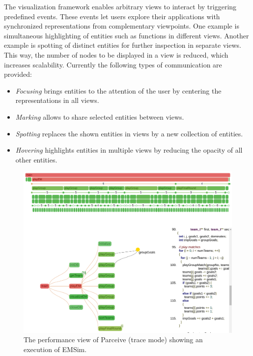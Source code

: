 The visualization framework enables arbitrary views to interact by triggering
predefined events. These events let users explore their applications with
synchronized representations from complementary viewpoints. One example is
simultaneous highlighting of entities such as functions in different views.
Another example is spotting of distinct entities for further inspection in
separate views. This way, the number of nodes to be displayed in a view is
reduced, which increases scalability. Currently the following types of
communication are provided:
\begin{itemize}
	\item \textit{Focusing} brings entities to the attention of the
user by centering the representations in all views.
	\item \textit{Marking} allows to share selected entities between views.
	\item \textit{Spotting} replaces the shown entities in views by a new
collection of entities.
	\item \textit{Hovering} highlights entities in multiple views by reducing
the opacity of all other entities.
\end{itemize}

\begin{figure}[ht!]
	\begin{center}
		\includegraphics[clip, trim=0.1cm 16.0cm 0.1cm 0.1cm,
width=\linewidth]{img/performance_view.pdf}
		\caption{The performance view of Parceive (trace mode) showing an execution
of EMSim.}
		\label{fig:emsim}
	\end{center}
\end{figure}
